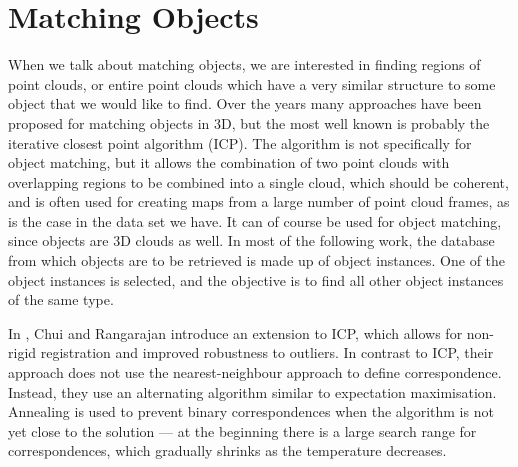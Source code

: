 \documentclass[11pt,a4paper]{kth-mag}
\begin{document}
\section{Matching Objects}
When we talk about matching objects, we are interested in finding regions of
point clouds, or entire point clouds which have a very similar structure to some
object that we would like to find. Over the years many approaches have been
proposed for matching objects in 3D, but the most well known is probably the
iterative closest point algorithm (ICP)\cite{besl1992method}. The algorithm is
not specifically for object matching, but it allows the combination of two point
clouds with overlapping regions to be combined into a single cloud, which should
be coherent, and is often used for creating maps from a large number of point
cloud frames, as is the case in the data set we have. It can of course be used
for object matching, since objects are 3D clouds as well. In most of the
following work, the database from which objects are to be retrieved is made up
of object instances. One of the object instances is selected, and the objective
is to find all other object instances of the same type.

In \cite{chui2003new}, Chui and Rangarajan introduce an extension to ICP, which
allows for non-rigid registration and improved robustness to outliers. In
contrast to ICP, their approach does not use the nearest-neighbour approach to
define correspondence. Instead, they use an alternating algorithm similar to
expectation maximisation. Annealing is used to prevent binary correspondences
when the algorithm is not yet close to the solution --- at the beginning there
is a large search range for correspondences, which gradually shrinks as the
temperature decreases.
\end{document}

